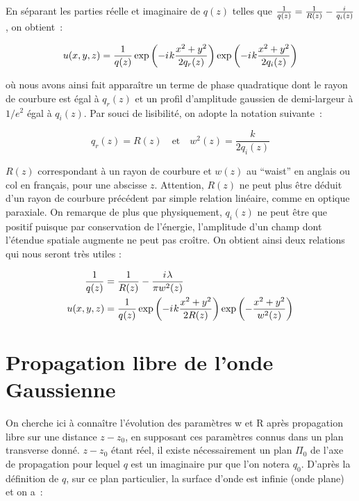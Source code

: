 \documentclass[a4paper]{book}
\newcommand{\iu}{{i\mkern1mu}}
\begin{document}
En séparant les parties réelle et imaginaire de $q(z)$ telles que $\frac{1}{q(z)}=\frac{1}{R(z)}-\frac{\iu}{q_i(z)}$, on obtient~:

\begin{equation}
    u(x,y,z)=\frac{1}{q(z)}\exp\left(-\iu k \frac{x^2 + y^2}{2q_r(z)}\right)\exp\left(-\iu k \frac{x^2 + y^2}{2q_i(z)}\right)
\end{equation}

où nous avons ainsi fait apparaître un terme de phase quadratique dont le rayon de courbure est égal à $q_r(z)$ et un profil d'amplitude gaussien de demi-largeur à $1/e^2$ égal à $q_i(z)$. Par souci de lisibilité, on adopte la notation suivante~:

\begin{equation}
    q_r(z)=R(z)\quad\mathrm{et}\quad w^2(z)=\frac{k}{2q_i(z)}
\end{equation}

$R(z)$ correspondant à un rayon de courbure et $w(z)$ au ``waist'' en anglais ou col en français, pour une abscisse $z$. Attention, $R(z)$ ne peut plus être déduit d'un rayon de courbure précédent par simple relation linéaire, comme en optique paraxiale. On remarque de plus que physiquement, $q_i(z)$ ne peut être que positif puisque par conservation de l'énergie, l'amplitude d'un champ dont l'étendue spatiale augmente ne peut pas croître. 
On obtient ainsi deux relations qui nous seront très utiles :

\begin{align}
    \frac{1}{q(z)}&=\frac{1}{R(z)}-\frac{\iu \lambda}{\pi w^2(z)}\\
    u(x,y,z)&=\frac{1}{q(z)}\exp\left(-\iu k \frac{x^2 + y^2}{2R(z)}\right)\exp\left(-\frac{x^2 + y^2}{w^2(z)}\right)
\end{align}
    


\section{Propagation libre de l'onde Gaussienne}

On cherche ici à connaître l'évolution des paramètres w et R après propagation libre sur une distance $z-z_0$, en supposant ces paramètres connus dans un plan transverse donné. $z-z_0$ étant réel, il existe nécessairement un plan $\Pi_0$ de l'axe de propagation pour lequel $q$ est un imaginaire pur que l'on notera $q_0$. D'après la définition de $q$, sur ce plan particulier, la surface d'onde est infinie (onde plane) et on a~:
\end{document}
